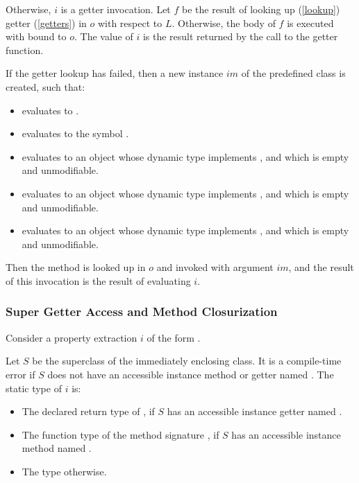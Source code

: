 \documentclass[makeidx]{article}
\begin{document}
{\LMHash{}%
Otherwise, $i$ is a getter invocation.
Let $f$ be the result of looking up (\ref{lookup}) getter
(\ref{getters})
\id{} in $o$ with respect to $L$.
Otherwise, the body of $f$ is executed with \THIS{} bound to $o$.
The value of $i$ is the result returned by the call to the getter function.

\LMHash{}%
If the getter lookup has failed,
then a new instance $im$ of the predefined class  is created,
such that:

\begin{itemize}
\item {} evaluates to \TRUE.
\item {} evaluates to the symbol .
\item {} evaluates to an object
  whose dynamic type implements ,
  and which is empty and unmodifiable.
\item {} evaluates to an object
  whose dynamic type implements ,
  and which is empty and unmodifiable.
\item {} evaluates to an object
  whose dynamic type implements ,
  and which is empty and unmodifiable.
\end{itemize}

\LMHash{}%
Then the method  is looked up
in $o$ and invoked with argument $im$,
and the result of this invocation is the result of evaluating $i$.



\subsubsection{Super Getter Access and Method Closurization}

\LMHash{}%
Consider a property extraction $i$ of the form .

\LMHash{}%
Let $S$ be the superclass of the immediately enclosing class.
It is a compile-time error if $S$ does not have
an accessible instance method or getter named \id.
The static type of $i$ is:

\begin{itemize}
\item The declared return type of ,
  if $S$ has an accessible instance getter named \id.
\item The function type of the method signature ,
  if $S$ has an accessible instance method named \id.
\item The type \DYNAMIC{} otherwise.
\end{itemize}

}
\end{document}

